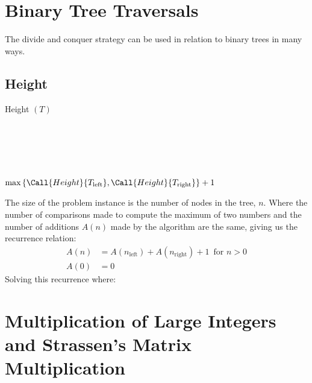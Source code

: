 \documentclass[12pt letter]{report}
\begin{document}
\chapter{Binary Tree Traversals}

The divide and conquer strategy can be used in relation to binary trees in many ways.

\section{Height}

\begin{algorithm}[H]
  \caption{Height $ \left( T \right) $}
  \Comment{}\\
   \\
   \\
   \\
  \begin{algorithmic}[1]
    \State {}
    \EndIf
    \State \Return  $\text{max} \left\{ \Call{Height}{T_{\text{left}}}, \Call{Height}{T_{\text{right}}} \right\} + 1$
  \end{algorithmic}
\end{algorithm}

The size of the problem instance is the number of nodes in the tree, $n$. Where the number of comparisons made to
compute the maximum of two numbers and the number of additions $A \left( n \right) $ made by the algorithm are the same,
giving us the recurrence relation:
\begin{align*}
  A \left( n \right) & = A \left( n_{\text{left}} \right) + A \left( n_{\text{right}} \right) + 1 \, \text{ for } n >
  0                                                                                                                   \\
  A \left( 0 \right) & = 0
\end{align*}
Solving this recurrence where:

\chapter{ Multiplication of Large Integers and Strassen's Matrix Multiplication }
\end{document}
